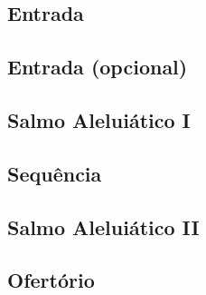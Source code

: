 \def\Prefix{tempus-paschale/dominica-pentecostes}

\subsection{Entrada}\label{subsection:tempus-paschale/dominica-pentecostes/introitus}

\subsection{Entrada (opcional)}\label{subsection:tempus-paschale/dominica-pentecostes/introitus-ad-libitum}

\AllowPageFlush

\subsection{Salmo Aleluiático I}\label{subsection:tempus-paschale/dominica-pentecostes/psalmus-alleluiaticus-1}

\subsection{Sequência}\label{subsection:tempus-paschale/dominica-pentecostes/sequentia}

\AllowPageFlush

\subsection{Salmo Aleluiático II}\label{subsection:tempus-paschale/dominica-pentecostes/psalmus-alleluiaticus-2}

\subsection{Ofertório}\label{subsection:tempus-paschale/dominica-pentecostes/offertorium}

